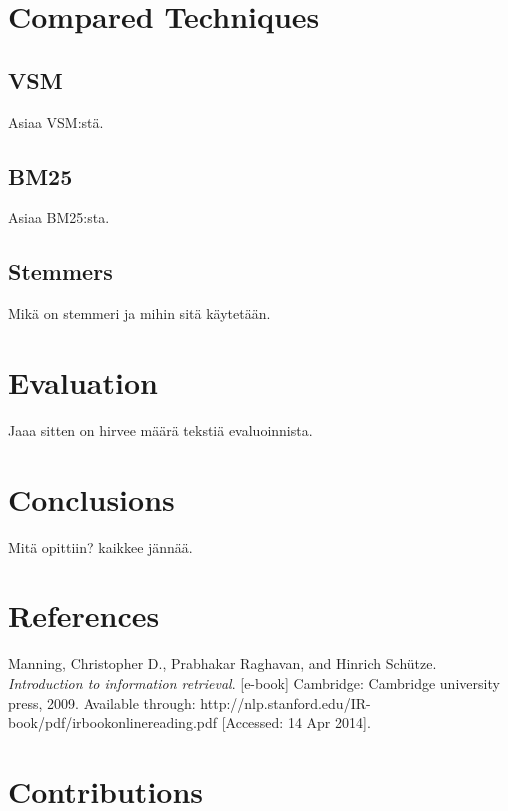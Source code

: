 \documentclass{aaltoseries}
\begin{document}

\chapter{Compared Techniques}
\section{VSM}
Asiaa VSM:stä.
\section{BM25}
Asiaa BM25:sta.
\section{Stemmers}
Mikä on stemmeri ja mihin sitä käytetään.

\chapter{Evaluation}
Jaaa sitten on hirvee määrä tekstiä evaluoinnista.



\chapter{Conclusions}
Mitä opittiin? kaikkee jännää.

\chapter{References}
Manning, Christopher D., Prabhakar Raghavan, and Hinrich Schütze. \textit {Introduction to information retrieval}. [e-book] Cambridge: Cambridge university press, 2009. Available through: http://nlp.stanford.edu/IR-book/pdf/\newline irbookonlinereading.pdf [Accessed: 14 Apr 2014].

\chapter{Contributions}
\end{document}
